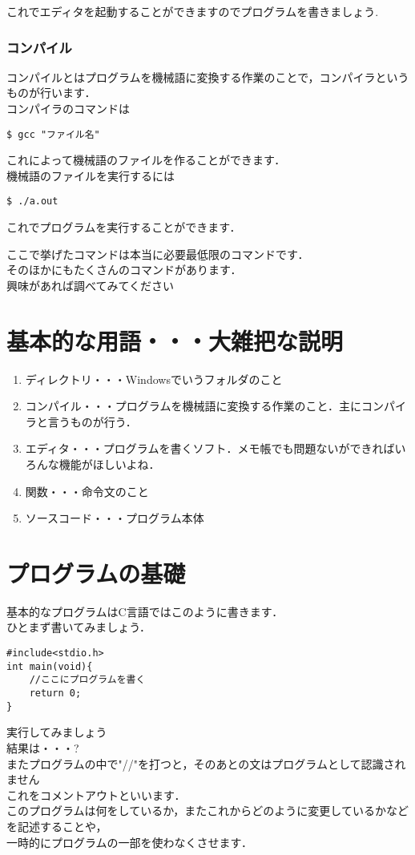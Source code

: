 \documentclass[a4j,titlepage,dvipdfmx]{jsarticle}   %
\begin{document}
これでエディタを起動することができますのでプログラムを書きましょう.\\

\subsubsection{コンパイル}
コンパイルとはプログラムを機械語に変換する作業のことで，コンパイラというものが行います．\\
コンパイラのコマンドは

\begin{lstlisting}
$ gcc "ファイル名"
\end{lstlisting}

これによって機械語のファイルを作ることができます．\\
機械語のファイルを実行するには
\begin{lstlisting}
$ ./a.out
\end{lstlisting}

これでプログラムを実行することができます．

ここで挙げたコマンドは本当に必要最低限のコマンドです．\\
そのほかにもたくさんのコマンドがあります．\\
興味があれば調べてみてください\\
\section{基本的な用語・・・大雑把な説明}
\begin{enumerate}
\item ディレクトリ・・・Windowsでいうフォルダのこと
\item コンパイル・・・プログラムを機械語に変換する作業のこと．主にコンパイラと言うものが行う．
\item エディタ・・・プログラムを書くソフト．メモ帳でも問題ないができればいろんな機能がほしいよね．
\item 関数・・・命令文のこと
\item ソースコード・・・プログラム本体
\end{enumerate}
\section{プログラムの基礎}
基本的なプログラムはC言語ではこのように書きます．\\
ひとまず書いてみましょう．\\
\begin{lstlisting}
#include<stdio.h>
int main(void){
	//ここにプログラムを書く
	return 0;
}
\end{lstlisting}
実行してみましょう\\
結果は・・・?\\
またプログラムの中で"//"を打つと，そのあとの文はプログラムとして認識されません\\
これをコメントアウトといいます．\\
このプログラムは何をしているか，またこれからどのように変更しているかなどを記述することや，\\
一時的にプログラムの一部を使わなくさせます．\\
\end{document}
